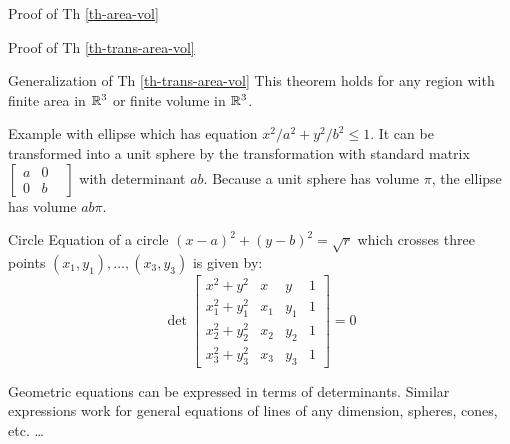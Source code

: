 \begin{card}
\begin{compactdesc}
    \item[Proof of Th \ref{th-area-vol}]
    \item[Proof of Th \ref{th-trans-area-vol}]
    \item[Generalization of Th \ref{th-trans-area-vol}] This theorem holds for
        any region with finite area in $\mathbb{R}^3$ or finite volume in $\mathbb{R}^3$.
    \item[Example with ellipse] which has equation $x^2/a^2 + y^2/b^2 \leq 1$.
        It can be transformed into a unit sphere by the transformation
        with standard matrix
        $\left[\begin{smallmatrix}
        a & 0 & \\ 0 & b
        \end{smallmatrix}\right]$ with determinant $ab$.
        Because a unit sphere has volume $\pi$, the ellipse has volume $ab\pi$.
    \item[Circle] Equation of a circle $(x - a)^2 + (y - b)^2 = \sqrt r$
        which crosses three points
        $(x_1, y_1), \dotsc, (x_3, y_3)$ is given by:
        $$
        \det \begin{bmatrix}
        x^2 + y^2 & x & y & 1
     \\ x_1^2 + y_1^2 & x_1 & y_1 & 1
     \\ x_2^2 + y_2^2 & x_2 & y_2 & 1
     \\ x_3^2 + y_3^2 & x_3 & y_3 & 1
        \end{bmatrix}
        = 0
        $$
    \item[Geometric equations] can be expressed in terms of determinants.
        Similar expressions work for general equations of lines of any dimension,
        spheres, cones, etc. \dots
    \end{compactdesc}
\end{card}

